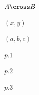 \documentclass[a4paper,10pt,fleqn]{article}
\begin{document}
\noindent
$A \cross B$


\noindent
$(x, y)$


\noindent
$(a, b, c)$


\noindent
$p.1$


\noindent
$p.2$


\noindent
$p.3$
\end{document}
